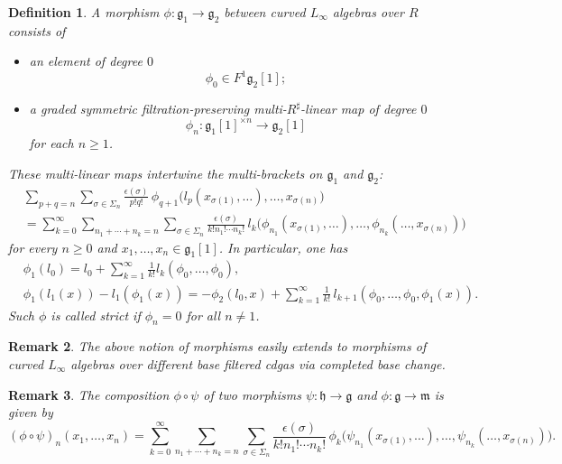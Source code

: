 \documentclass[12pt]{amsart}
\newtheorem{defn}{Definition}[section]
\newtheorem{rmk}[defn]{Remark}
\numberwithin{equation}{section}
\theoremstyle{plain}
\newcommand{\fg}{\mathfrak{g}}
\newcommand{\fh}{\mathfrak{h}}
\newcommand{\fm}{\mathfrak{m}}
\newcommand{\uR}{{R^\sharp}}
\begin{document}
	\begin{defn}
		A \emph{morphism} $\phi\colon \fg_1 \rightarrow \fg_2$ between curved $L_\infty$ algebras over $R$ consists of 
		\begin{itemize}
			\item an element of degree $0$
			\[
			\phi_0 \in F^1 \fg_2[1];
			\]
			\item a graded symmetric filtration-preserving multi-$\uR$-linear map of degree $0$
			\[
			\phi_n\colon \fg_1[1]^{\times n} \rightarrow \fg_2[1]
			\]
			for each $n \geq 1$.
		\end{itemize}
		These multi-linear maps intertwine the multi-brackets on $\fg_1$ and $\fg_2$: 
		\begin{align*}
			&\sum_{p+q=n} \sum_{\sigma \in \Sigma_n}\frac{\epsilon(\sigma)}{p!q!} \,
			\phi_{q+1}\big(
			l_p(x_{\sigma(1)},\dots),\dots,x_{\sigma(n)}
			\big) \\
			&= \sum_{k=0}^{\infty} \sum_{n_1+\cdots+n_k=n} \sum_{\sigma\in \Sigma_n} \frac{\epsilon(\sigma)}{k!n_1!\cdots n_k!}
			\, l_k \big(
			\phi_{n_1}(x_{\sigma(1)},\dots),
			\dots,
			\phi_{n_k}(\dots,x_{\sigma(n)})
			\big)
		\end{align*}
		for every $n \ge 0$ and  $x_1,\dots,x_n \in \fg_1[1]$. In particular, one has 
		\begin{align*}
			&\phi_1(l_0) =  l_0 + \sum_{k=1}^\infty \frac{1}{k!}l_k(\phi_0, \dots, \phi_0), \\
			&\phi_1(l_1(x)) - l_1(\phi_1(x))
			=
			-\phi_2(l_0,x) 
			+ \sum_{k = 1}^\infty \frac{1}{k!}\, l_{k+1}(\phi_0,\dots, \phi_0, \phi_1(x)).
		\end{align*}
		Such $\phi$ is called \emph{strict} if $\phi_n = 0$ for all $n \neq 1$.
	\end{defn}
	\begin{rmk}
		The above notion of morphisms easily extends to morphisms of curved $L_\infty$ algebras over different base filtered cdgas via completed base change.
	\end{rmk}
	\begin{rmk}
		The composition $\phi \circ \psi$ of two morphisms $\psi \colon \fh \to \fg$ and $\phi \colon \fg \to \fm$ is given by
		\[
		(\phi \circ \psi)_n(x_1, \dots, x_n)
		=
		\sum_{k=0}^{\infty}
		\sum_{n_1 + \cdots + n_k = n}
		\sum_{\sigma \in \Sigma_n}
		\frac{\epsilon(\sigma)}{k!n_1! \cdots n_k!}
		\, \phi_k\!\Big(
		\psi_{n_1}(x_{\sigma(1)}, \dots), \dots, \psi_{n_k}(\dots, x_{\sigma(n)})
		\Big).
		\]
	\end{rmk}
	
\end{document}
